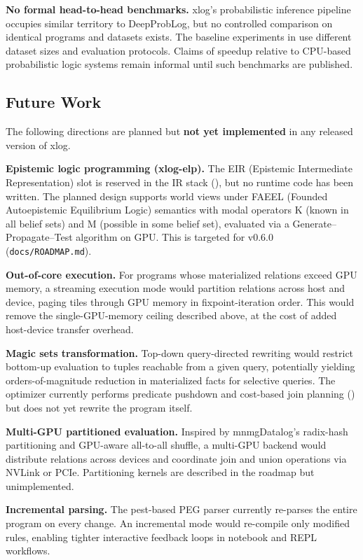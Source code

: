 \textbf{No formal head-to-head benchmarks.} xlog's probabilistic inference pipeline occupies similar territory to DeepProbLog, but no controlled comparison on identical programs and datasets exists. The baseline experiments in  use different dataset sizes and evaluation protocols. Claims of speedup relative to CPU-based probabilistic logic systems remain informal until such benchmarks are published.

\subsection{Future Work}

The following directions are planned but \textbf{not yet implemented} in any released version of xlog.

\textbf{Epistemic logic programming (xlog-elp).} The EIR (Epistemic Intermediate Representation) slot is reserved in the IR stack (), but no runtime code has been written. The planned design supports world views under FAEEL (Founded Autoepistemic Equilibrium Logic) semantics with modal operators K (known in all belief sets) and M (possible in some belief set), evaluated via a Generate--Propagate--Test algorithm on GPU. This is targeted for v0.6.0 (\texttt{docs/ROADMAP.md}).

\textbf{Out-of-core execution.} For programs whose materialized relations exceed GPU memory, a streaming execution mode would partition relations across host and device, paging tiles through GPU memory in fixpoint-iteration order. This would remove the single-GPU-memory ceiling described above, at the cost of added host-device transfer overhead.

\textbf{Magic sets transformation.} Top-down query-directed rewriting would restrict bottom-up evaluation to tuples reachable from a given query, potentially yielding orders-of-magnitude reduction in materialized facts for selective queries. The optimizer currently performs predicate pushdown and cost-based join planning () but does not yet rewrite the program itself.

\textbf{Multi-GPU partitioned evaluation.} Inspired by mnmgDatalog's radix-hash partitioning and GPU-aware all-to-all shuffle, a multi-GPU backend would distribute relations across devices and coordinate join and union operations via NVLink or PCIe. Partitioning kernels are described in the roadmap but unimplemented.

\textbf{Incremental parsing.} The pest-based PEG parser currently re-parses the entire program on every change. An incremental mode would re-compile only modified rules, enabling tighter interactive feedback loops in notebook and REPL workflows.
